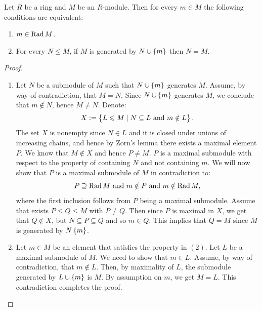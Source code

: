 \documentclass[11pt,a4paper]{article}
\begin{document}
\begin{lemma}
  Let $R$ be a ring and $M$ be an $R$-module.
  Then for every $m \in M$ the following conditions are equivalent:
  \begin{enumerate}
    \item[(1)] $m \in \operatorname{Rad} M$.
    \item[(2)] For every $N \leqslant M$,
      if $M$ is generated by $N \cup \left\{m\right\}$ then $N = M$.
  \end{enumerate}
\end{lemma}
\begin{proof} \phantom{}
  \begin{enumerate}
    \item[$(1) \implies (2)$] Let $N$ be a submodule of $M$
      such that $N \cup \left\{m\right\}$ generates $M$.
      Assume, by way of contradiction, that $M = N$.
      Since $N \cup \left\{m\right\}$ generates $M$,
      we conclude that $m \notin N$, hence $M \neq N$.
      Denote:
      \[
        X := \left\{L \leqslant M \mid N \subseteq L \text{ and } m \notin L\right\}.
      \]
      The set $X$ is nonempty since $N \in L$ and it is closed under unions
      of increasing chains, and hence by Zorn's lemma there exists a maximal
      element $P$.
      We know that $M \notin X$ and hence $P \neq M$.
      $P$ is a maximal submodule with respect to the property of containing $N$
      and not containing $m$.
      We will now show that $P$ is a maximal submodule of $M$
      in contradiction to:
      \[
        P \supseteq \operatorname{Rad} M \text{ and } m \notin P \text{ and } m \notin \operatorname{Rad} M,
      \]
      where the first inclusion follows from $P$ being a maximal submodule.
      Assume that exists $P \leqslant Q \leqslant M$ with $P \neq Q$.
      Then since $P$ is maximal in $X$, we get that $Q \notin X$,
      but $N \subseteq P \subseteq Q$ and so $m \in Q$.
      This implies that $Q = M$ since $M$ is generated by $N \left\{m\right\}$.
    \item[$(2) \implies (1)$]
      Let $m \in M$ be an element that satisfies the property in $(2)$.
      Let $L$ be a maximal submodule of $M$.
      We need to show that $m \in L$.
      Assume, by way of contradiction, that $m \notin L$.
      Then, by maximality of $L$,
      the submodule generated by $L \cup \left\{m\right\}$ is $M$.
      By assumption on $m$, we get $M = L$.
      This contradiction completes the proof.
  \end{enumerate}
\end{proof}
\end{document}
